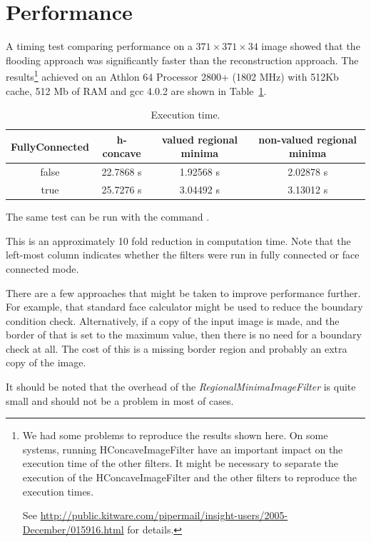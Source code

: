 \documentclass{InsightArticle}
\begin{document}
\section{Performance}
A timing test comparing performance on a $371 \times 371 \times 34$
image showed that the flooding approach was significantly faster than
the reconstruction approach. The results\footnote{We had some problems
to reproduce the results shown here. On some systems, running
HConcaveImageFilter have an important impact on the execution time of the other
filters. It might be necessary to separate the execution of the 
HConcaveImageFilter and the other filters to reproduce the execution
times.

See \url{http://public.kitware.com/pipermail/insight-users/2005-December/015916.html}
for details.} achieved on an Athlon 64 
Processor 2800+ (1802 MHz) with 512Kb cache, 512 Mb of RAM and gcc
4.0.2 are shown in Table~\ref{perf}.

\begin{table}[htbp]
\centering
\begin{tabular}{cccc}
\hline
FullyConnected & h-concave & valued regional minima & non-valued regional minima \\
\hline
\hline
false & 22.7868 s & 1.92568 s & 2.02878 s\\
true  & 25.7276 s & 3.04492 s & 3.13012 s\\
\hline
\end{tabular}
\caption{Execution time.\label{perf}}
\end{table}

The same test can be run with the command .

This is an approximately 10 fold reduction in computation time. Note
that the left-most column indicates whether the filters were run in
fully connected or face connected mode.

There are a few approaches that might be taken to improve performance
further. For example, that standard face calculator might be used to
reduce the boundary condition check. Alternatively, if a copy of the
input image is made, and the border of that is set to the maximum
value, then there is no need for a boundary check at all. The cost of
this is a missing border region and probably an extra copy of the
image.

It should be noted that the overhead of the {\em RegionalMinimaImageFilter}
is quite small and should not be a problem in most of cases.
\end{document}
